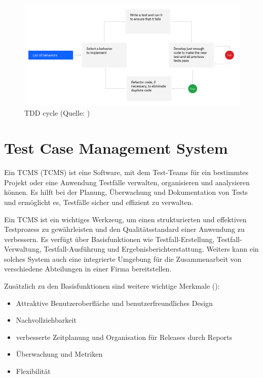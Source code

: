 \documentclass[a4paper, fontsize=11pt, parskip=half, twoside]{scrreprt}
\begin{document}
	\begin{figure}[ht]
		\centering
		\includegraphics[scale=0.25]{assets/tdd-cycle.png}
		\caption{\acl{TDD} cycle (Quelle: \textcite{noauthor_test-driven_nodate})}
		\label{fig:tdd-cycle}
	\end{figure}
	
	\section{Test Case Management System} \label{sec:tcms}
	Ein \acl{TCMS} (\ac{TCMS}) ist eine Software, mit dem Test-Teams für ein bestimmtes Projekt oder eine Anwendung Testfälle verwalten, organisieren und analysieren können.
	Es hilft bei der Planung, Überwachung und Dokumentation von Tests und ermöglicht es, Testfälle sicher und effizient zu verwalten.
	
	Ein \ac{TCMS} ist ein wichtiges Werkzeug, um einen strukturierten und effektiven Testprozess zu gewährleisten und den Qualitätsstandard einer Anwendung zu verbessern.
	Es verfügt über Basisfunktionen wie Testfall-Erstellung, Testfall-Verwaltung, Testfall-Ausführung und Ergebnisberichterstattung. 
	Weiters kann ein solches System auch eine integrierte Umgebung für die Zusammenarbeit von verschiedene Abteilungen in einer Firma bereitstellen.
	
	Zusätzlich zu den Basisfunktionen sind weitere wichtige Merkmale (\textcite{lead_articles_nodate}):
	
	\begin{itemize}
		\item Attraktive Benutzeroberfläche und benutzerfreundliches Design
		\item Nachvollziehbarkeit
		\item verbesserte Zeitplanung und Organisation für Releases durch Reports
		\item Überwachung und Metriken
		\item Flexibilität
	\end{itemize}
	
\end{document}
